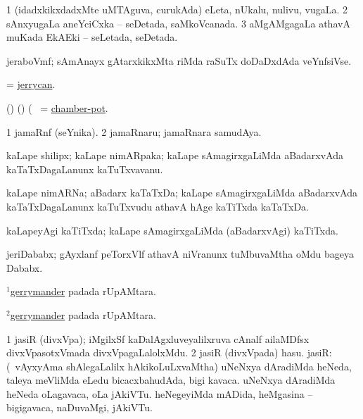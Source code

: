 \bentry
{}
\gl{\gu}
\bmng
\bnum
\num{1} (idadxkikxdadxMte uMTAguva, curukAda) eLeta, nUkalu, nulivu, \mo vugaLa. 
\num{2} sAnxyugaLa aneYciCxka -- seDetada, saMkoVcanada. 
\num{3} aMgAMgagaLa athavA muKada EkAEki -- seLetada, seDetada. 
\enum
\emng
\eentry

\bentry
{}
\gl{\nA}
\bmng
jeraboVmf; sAmAnayx gAtarxkikxMta  riMda raSuTx doDaDxdAda veYnfsiVse. 
\emng
\eentry

\bentry
{}
\gl{\nA}
\bmng
= \hyperlink{jerrycan}{jerrycan}. 
\emng
\eentry

\bentry
{}
\gl{\nA}
\bmng
(\birx) (\ashi) (\bava\  = \hyperref{kandict_c.pdf}{C}{chamber-pot}{chamber-pot}. 
\emng
\eentry

\bentry
{}
\gl{\nA}
\bmng
\bnum
\num{1} jamaRnf (seYnika). 
\num{2} jamaRnaru; jamaRnara samudAya. 
\enum
\emng
\eentry

\bentry
{}
\gl{\nA}
\bmng
kaLape shilipx; kaLape nimARpaka; kaLape sAmagirxgaLiMda aBadarxvAda kaTaTxDagaLanunx kaTuTxvavanu. 
\emng
\eentry

\bentry
{}
\gl{\nA}
\bmng
kaLape nimARNa; aBadarx kaTaTxDa; kaLape sAmagirxgaLiMda aBadarxvAda kaTaTxDagaLanunx kaTuTxvudu athavA hAge kaTiTxda kaTaTxDa. 
\emng
\eentry

\bentry
{}
\gl{\gu}
\bmng
kaLapeyAgi kaTiTxda; kaLape sAmagirxgaLiMda (aBadarxvAgi) kaTiTxda. 
\emng
\eentry

\bentry
{}
\gl{\nA}
\bmng
jeriDababx;  gAyxlanf peTorxVlf athavA niVranunx tuMbuvaMtha oMdu bageya Dababx. 
\emng
\eentry

\bentry
{}
\gl{\sakirx}
\bmng
\hyperref{kandict_g.pdf}{G}{gerrymander(1)}{$^1$gerrymander} padada rUpAMtara. 
\emng
\eentry

\bentry
{}
\gl{\nA}
\bmng
\hyperref{kandict_g.pdf}{G}{gerrymander(2)}{$^2$gerrymander} padada rUpAMtara. 
\emng
\eentry

\bentry
{}
\gl{\nA}
\bmng
\bnum
\num{1} jasiR (divxVpa); iMgilxSf kaDalAgxluveyalilxruva cAnalf ailaMDfsx divxVpasotxVmada divxVpagaLalolxMdu. 
\num{2}  jasiR (divxVpada) hasu. 
 jasiR: 
\banum
{} (\kanmu\ vAyxyAma shAlegaLalilx hAkikoLuLxvaMtha) uNeNxya dAradiMda heNeda, taleya meVliMda eLedu bicacxbahudAda, bigi kavaca. 
 uNeNxya dAradiMda heNeda oLagavaca, oLa jAkiVTu. 
 heNegeyiMda mADida, heMgasina -- bigigavaca, naDuvaMgi, jAkiVTu. 
\eanum
\numie
\enum
\emng
\eentry

